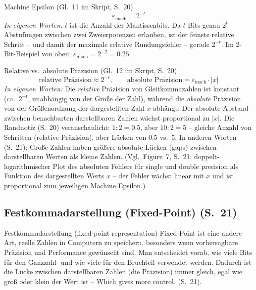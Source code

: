 \begin{satzbox}{Machine Epsilon (Gl.~11 im Skript, S.~20)}
\[
\varepsilon_{\text{mach}} = 2^{-t}
\]
\emph{In eigenen Worten:} $t$ ist die Anzahl der Mantissenbits. Da $t$ Bits genau $2^t$ Abstufungen zwischen zwei Zweierpotenzen erlauben, ist der feinste relative Schritt -- und damit der maximale relative Rundungsfehler -- gerade $2^{-t}$. Im 2-Bit-Beispiel von oben: $\varepsilon_{\text{mach}} = 2^{-2} = 0.25$.
\end{satzbox}

\begin{satzbox}{Relative vs.\ absolute Präzision (Gl.~12 im Skript, S.~20)}
\[
\text{relative Präzision} \approx 2^{-t}, \qquad \text{absolute Präzision} = \varepsilon_{\text{mach}} \cdot |x|
\]
\emph{In eigenen Worten:} Die \emph{relative} Präzision von Gleitkommazahlen ist konstant (ca.\ $2^{-t}$, unabhängig von der Größe der Zahl), während die \emph{absolute} Präzision von der Größenordnung der dargestellten Zahl $x$ abhängt: Der absolute Abstand zwischen benachbarten darstellbaren Zahlen wächst proportional zu $|x|$. Die Randnotiz (S.~20) veranschaulicht: $1 : 2 = 0.5$, aber $10 : 2 = 5$ -- gleiche Anzahl von Schritten (relative Präzision), aber Lücken von $0.5$ vs.\ $5$. In anderen Worten (S.~21): Große Zahlen haben größere absolute Lücken (gaps) zwischen darstellbaren Werten als kleine Zahlen. (Vgl.\ Figure~7, S.~21: doppelt-logarithmischer Plot des absoluten Fehlers für single und double precision als Funktion des dargestellten Werts $x$ -- der Fehler wächst linear mit $x$ und ist proportional zum jeweiligen Machine Epsilon.)
\end{satzbox}

\subsection{Festkommadarstellung (Fixed-Point) (S.~21)}

\begin{defbox}{Festkommadarstellung (fixed-point representation)}
Fixed-Point ist eine andere Art, reelle Zahlen in Computern zu speichern, besonders wenn vorhersagbare Präzision und Performance gewünscht sind. Man entscheidet vorab, wie viele Bits für den Ganzzahl- und wie viele für den Bruchteil verwendet werden. Dadurch ist die Lücke zwischen darstellbaren Zahlen (die Präzision) immer gleich, egal wie groß oder klein der Wert ist -- \glqq Which gives more control.\grqq{} (S.~21).
\end{defbox}

